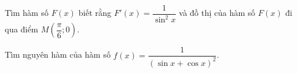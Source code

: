 \begin{bt}%
	Tìm hàm số $F(x)$ biết rằng $F'(x) =\dfrac{1}{\sin^2x}$ và đồ thị của hàm số $F(x)$ đi qua điểm $M \left (\dfrac{\pi}{6};0\right )$.
\end{bt}


\begin{bt}%
	Tìm nguyên hàm của hàm số $f(x)=\dfrac{1}{\left(\sin x+\cos x\right)^2}$.
\end{bt}

